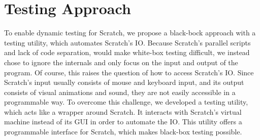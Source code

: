 
\chapter{Testing Approach}



To enable dynamic testing for Scratch, we propose a black-bock approach with a testing utility, which automates Scratch's IO.
Because Scratch's parallel scripts and lack of code separation, would make white-box testing difficult,
we instead chose to ignore the internals and only focus on the input and output of the program.
Of course, this raises the question of how to access Scratch's IO.
Since Scratch's input usually consists of mouse and keyboard input, and its output consists of visual animations and sound,
they are not easily accessible in a programmable way.
To overcome this challenge, we developed a testing utility, which acts like a wrapper around Scratch.
It interacts with Scratch's virtual machine instead of its GUI in order to automate the IO.
This utility offers a programmable interface for Scratch, which makes black-box testing possible.




